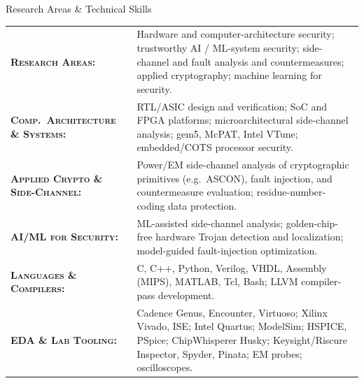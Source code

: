\begin{rSection}{Research Areas \& Technical Skills}

\begin{tabularx}{\textwidth}{@{}p{5.1cm} X@{}}
    \textsc{\textbf{Research Areas:}} & Hardware and computer-architecture security; trustworthy AI / ML-system security; side-channel and fault analysis and countermeasures; applied cryptography; machine learning for security.\\
    \textsc{\textbf{Comp.\ Architecture \& Systems:}} & RTL/ASIC design and verification; SoC and FPGA platforms; microarchitectural side-channel analysis; gem5, McPAT, Intel VTune; embedded/COTS processor security.\\
    \textsc{\textbf{Applied Crypto \& Side-Channel:}} & Power/EM side-channel analysis of cryptographic primitives (e.g.\ ASCON), fault injection, and countermeasure evaluation; residue-number-coding data protection.\\
    \textsc{\textbf{AI/ML for Security:}} & ML-assisted side-channel analysis; golden-chip-free hardware Trojan detection and localization; model-guided fault-injection optimization.\\
    \textsc{\textbf{Languages \& Compilers:}} & C, C++, Python, Verilog, VHDL, Assembly (MIPS), MATLAB, Tcl, Bash; LLVM compiler-pass development.\\
    \textsc{\textbf{EDA \& Lab Tooling:}} & Cadence Genus, Encounter, Virtuoso; Xilinx Vivado, ISE; Intel Quartus; ModelSim; HSPICE, PSpice; ChipWhisperer Husky; Keysight/Riscure Inspector, Spyder, Pinata; EM probes; oscilloscopes.\\
\end{tabularx}

\end{rSection}
